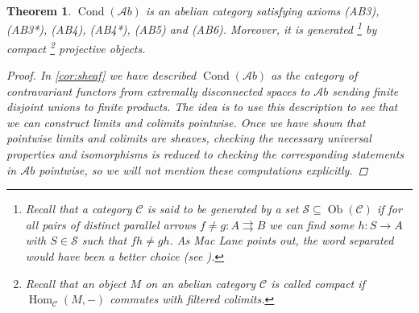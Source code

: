 \documentclass[11pt,A4]{article}
\theoremstyle{plain}
\newtheorem{thm}{Theorem}[section]
\theoremstyle{definition}
\theoremstyle{remark}
\newcommand{\C}{\mathscr{C}}
\newcommand{\Ab}{\mathscr{A}b}
\DeclareMathOperator{\Hom}{Hom}
\DeclareMathOperator{\Cond}{Cond}
\DeclareMathOperator{\Ob}{Ob}
\begin{document}
\begin{thm}
    $\Cond(\Ab)$ is an abelian category satisfying axioms (AB3), (AB3*), (AB4), (AB4*), (AB5) and (AB6).
    Moreover, it is generated
    \footnote{Recall that a category $\C$ is said to be \textit{generated} by a set $\mathscr{S}\subseteq \Ob(\C)$ if for all pairs of distinct parallel arrows $f\neq g\colon A\rightrightarrows B$ we can find some $h\colon S\to A$ with $S\in \mathscr{S}$ such that $fh\neq gh$.
    As Mac Lane points out, the word \textit{separated} would have been a better choice (see \cite[Section V.7]{mac78}).}
    by compact
    \footnote{Recall that an object $M$ on an abelian category $\C$ is called \textit{compact} if $\Hom_{\C}(M,-)$ commutes with filtered colimits.} projective objects.
    \begin{proof}
	In \cref{cor:sheaf} we have described $\Cond(\Ab)$ as the category of contravariant functors from extremally disconnected spaces to $\Ab$ sending finite disjoint unions to finite products.
	The idea is to use this description to see that we can construct limits and colimits pointwise.
	Once we have shown that pointwise limits and colimits are sheaves, checking the necessary universal properties and isomorphisms is reduced to checking the corresponding statements in $\Ab$ pointwise, so we will not mention these computations explicitly.
	

\end{proof}
\end{thm}
\end{document}
